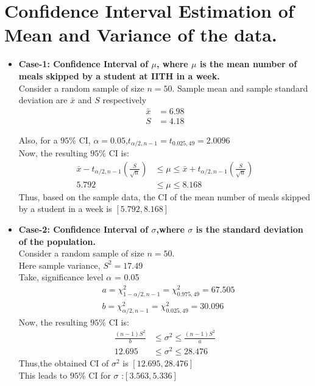 \documentclass{article}
\begin{document}
\bigskip
\section{Confidence Interval Estimation of Mean and Variance of the data.}
\begin{itemize}
    \item \textbf{Case-1: Confidence Interval of $\mu$, where $\mu$ is the mean number of meals skipped by a student at IITH in a week. } \\
       Consider a random sample of size $n = 50$. 
       Sample mean and sample standard deviation are $\bar{x}$ and $S$ respectively\\
        \begin{align*}
            \bar{x}&= 6.98 \\
            S &= 4.18 
        \end{align*}       
      
Also, for a $95\%$ CI, $\alpha=0.05$,$t_{\alpha/2,n-1} =t_{0.025,49}=2.0096$ \\
Now, the resulting $95\%$ CI is:
      \begin{align*}
        \bar{x}-t_{\alpha/2,n-1}\left(\frac{S}{\sqrt{n}}\right) &\leq \mu \leq \bar{x}+t_{\alpha/2,n-1}\left(\frac{S}{\sqrt{n}}\right)\\
        5.792 &\leq \mu \leq 8.168
      \end{align*}
      Thus, based on the sample data, the CI of the mean number of meals skipped by a student in a week is $[5.792,8.168]$\\
    \item \textbf{Case-2: Confidence Interval of $\sigma$,where $\sigma$ is the standard deviation of the population.} \\
       Consider a random sample of size $n = 50$.   \\
       Here sample variance,    $S^2 = 17.49$  \\
       Take, significance level $\alpha$ = 0.05                
        \begin{align*}
            &a = \chi^{2}_{1-\alpha/2,n-1} = \chi^{2}_{0.975,49} =67.505 \\
            &b = \chi^{2}_{\alpha/2,n-1} = \chi^{2}_{0.025,49} = 30.096
        \end{align*} 
        Now, the resulting $95\%$ CI is:
        \begin{align*}
            \frac{(n-1)S^2}{b} &\leq \sigma^2 \leq \frac{(n-1)S^2}{a}\\
            12.695 &\leq \sigma^2 \leq 28.476
          \end{align*}
          Thus,the obtained CI of $\sigma^2$ is $[12.695,28.476]$\\
          This leads to $95\%$ CI for $\sigma$ :$[3.563,5.336]$\\
\end{itemize}
\end{document}
